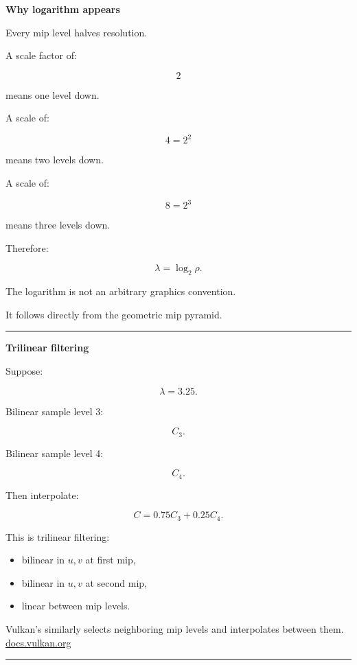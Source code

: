 \textbf{Why logarithm appears}

Every mip level halves resolution.

A scale factor of:

\[
2
\]

means one level down.

A scale of:

\[
4=2^2
\]

means two levels down.

A scale of:

\[
8=2^3
\]

means three levels down.

Therefore:

\[
\lambda=\log_2\rho.
\]

The logarithm is not an arbitrary graphics convention.

It follows directly from the geometric mip pyramid.

\begin{center}\rule{0.5\linewidth}{0.5pt}\end{center}

\textbf{Trilinear filtering}

Suppose:

\[
\lambda=3.25.
\]

Bilinear sample level 3:

\[
C_3.
\]

Bilinear sample level 4:

\[
C_4.
\]

Then interpolate:

\[
\boxed{
C=
0.75C_3+0.25C_4.
}
\]

This is trilinear filtering:

\begin{itemize}
\tightlist
\item
  bilinear in \(u,v\) at first mip,
\item
  bilinear in \(u,v\) at second mip,
\item
  linear between mip levels.
\end{itemize}

Vulkan's  similarly selects neighboring mip levels and interpolates between them. \href{https://docs.vulkan.org/tutorial/latest/09_Generating_Mipmaps.html?utm_source=chatgpt.com}{docs.vulkan.org}

\begin{center}\rule{0.5\linewidth}{0.5pt}\end{center}

